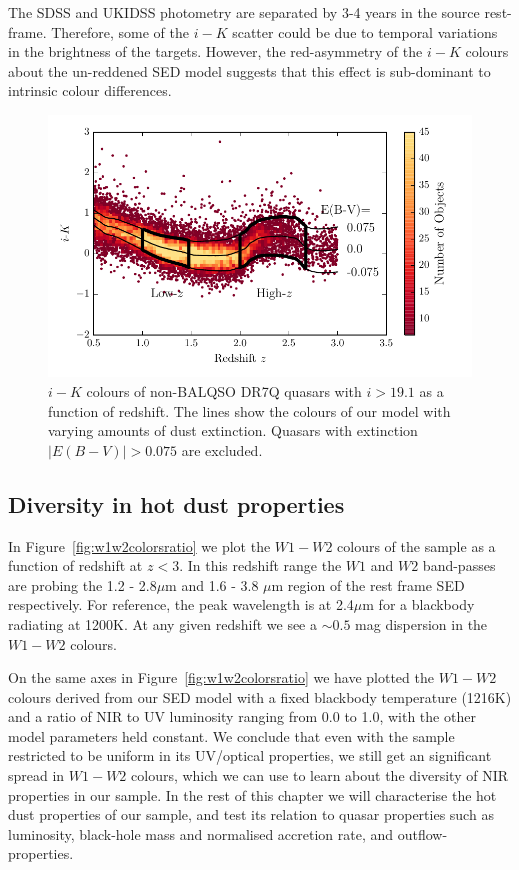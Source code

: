 The SDSS and UKIDSS photometry are separated by 3-4 years in the source rest-frame. 
Therefore, some of the $i-K$ scatter could be due to temporal variations in the brightness of the targets. 
However, the red-asymmetry of the $i-K$ colours about the un-reddened SED model suggests that this effect is sub-dominant to intrinsic colour differences. 

\begin{figure}
  \centering
  \includegraphics[width=\columnwidth]{figures/chapter05/ik_versus_z_low_ext.pdf}
  \caption[{$i-K$ colours of non-BALQSO DR7Q quasars with $i>19.1$ as a function of redshift.}]{$i-K$ colours of non-BALQSO DR7Q quasars with $i>19.1$ as a function of redshift. The lines show the colours of our model with varying amounts of dust extinction. Quasars with extinction $|E(B-V)|>0.075$ are excluded.}
  \label{fig:ikzplot}
\end{figure}

\subsection{Diversity in hot dust properties}

In Figure~\ref{fig:w1w2colorsratio} we plot the $W1 - W2$ colours of the sample as a function of redshift at $z<3$. 
In this redshift range the $W1$ and $W2$ band-passes are probing the 1.2 - 2.8$\mu$m and 1.6 - 3.8 $\mu$m region of the rest frame SED respectively. 
For reference, the peak wavelength is at 2.4$\mu$m for a blackbody radiating at 1200K. 
At any given redshift we see a $\sim 0.5$ mag dispersion in the $W1-W2$ colours. 

On the same axes in Figure~\ref{fig:w1w2colorsratio} we have plotted the $W1-W2$ colours derived from our SED model with a fixed blackbody temperature (1216K) and a ratio of NIR to UV luminosity ranging from 0.0 to 1.0, with the other model parameters held constant. 
We conclude that even with the sample restricted to be uniform in its UV/optical properties, we still get an significant spread in $W1-W2$ colours, which we can use to learn about the diversity of NIR properties in our sample. 
In the rest of this chapter we will characterise the hot dust properties of our sample, and test its relation to quasar properties such as luminosity, black-hole mass and normalised accretion rate, and outflow-properties. 


